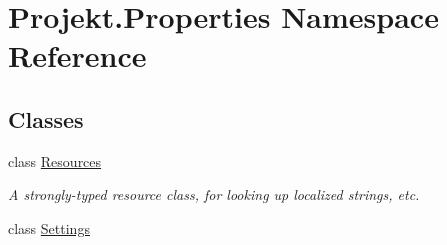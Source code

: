 \hypertarget{namespace_projekt_1_1_properties}{}\section{Projekt.\+Properties Namespace Reference}
\label{namespace_projekt_1_1_properties}
\subsection*{Classes}
\begin{DoxyCompactItemize}
\item 
class \mbox{\hyperlink{class_projekt_1_1_properties_1_1_resources}{Resources}}
\begin{DoxyCompactList}\small\item\em A strongly-\/typed resource class, for looking up localized strings, etc. \end{DoxyCompactList}\item 
class \mbox{\hyperlink{class_projekt_1_1_properties_1_1_settings}{Settings}}
\end{DoxyCompactItemize}
